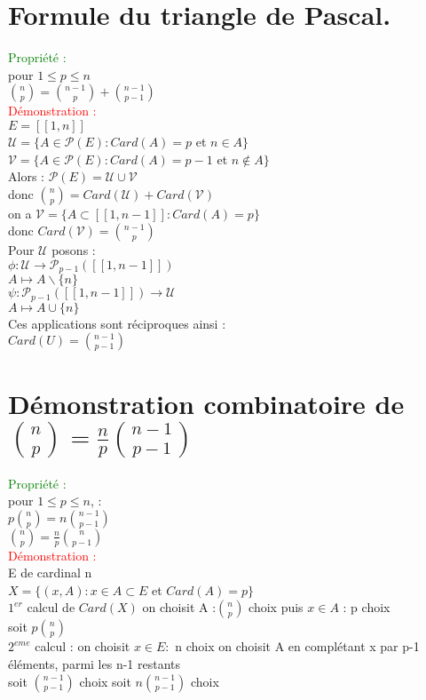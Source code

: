 \documentclass{article}
\begin{document}
\section{Formule du triangle de Pascal.}
\textcolor{green}{Propriété :} \\
pour $1 \leq p \leq n$ \\
$\binom{n}{p}=\binom{n-1}{p} +\binom{n-1}{p-1}$ \\
\textcolor{red}{Démonstration :} \\
$E=[[1,n]]$ \\
$\mathcal U= \lbrace A \in \mathcal P(E): Card(A)=p$ et $n\in A \rbrace$ \\
$\mathcal V= \lbrace A \in \mathcal P(E) : Card(A)=p-1$ et $n \notin A \rbrace$ \\
Alors : $\mathcal P(E)= \mathcal U \cup \mathcal V$ \\
donc $\binom{n}{p}= Card(\mathcal  U) + Card(\mathcal V)$ \\
on a $\mathcal V= \lbrace A \subset [[1,n-1]] : Card(A)=p \rbrace $ \\
donc $Card(\mathcal V)=\binom{n-1}{p}$ \\
Pour $\mathcal U$ posons : \\
$\phi : \mathcal U \rightarrow \mathcal P_{p-1}([[1,n-1]])$ \\
$A \mapsto A \backslash \lbrace n \rbrace$ \\
$\psi : \mathcal P_{p-1}([[1,n-1]])\rightarrow \mathcal U$ \\
$A \mapsto A \cup \lbrace n \rbrace $ \\
Ces applications sont réciproques ainsi : \\
$Card(U)= \binom{n-1}{p-1}$
\section{Démonstration combinatoire de $\binom{n}{p}= \frac n p \binom{n-1}{p-1}$}
\textcolor{green}{Propriété :} \\
pour $1 \leq p \leq n$, : \\
$p\binom{n}{p} = n \binom{n-1}{p-1}$ \\
$\binom n p = \frac n p \binom{n}{p-1}$ \\
\textcolor{red}{Démonstration : } \\
E de cardinal n \\
$X= \lbrace (x,A) : x \in A \subset E$ et $Card(A)=p \rbrace$ \\
$1^{er}$ calcul de $Card(X)$ on choisit A :$\binom{n}{p}$ choix puis $x\in A$ : p choix \\
soit $p \binom n p$ \\
$2^{eme}$ calcul : on choisit $x \in E :$ n choix on choisit A en complétant x par p-1 éléments, parmi les n-1 restants \\
soit $\binom{n-1}{p-1}$ choix soit $n\binom{n-1}{p-1}$ choix \\
\end{document}
